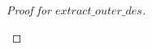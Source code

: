 \documentclass[11pt]{article} %
\begin{document}
\begin{proof}[Proof for $extract\_outer\_des$]
\begin{itemize}
\begin{itemize}
\end{itemize}

\end{itemize}

%
%
%
%
%
%
%
%
%
%
%
%

\end{proof}
\end{document}

